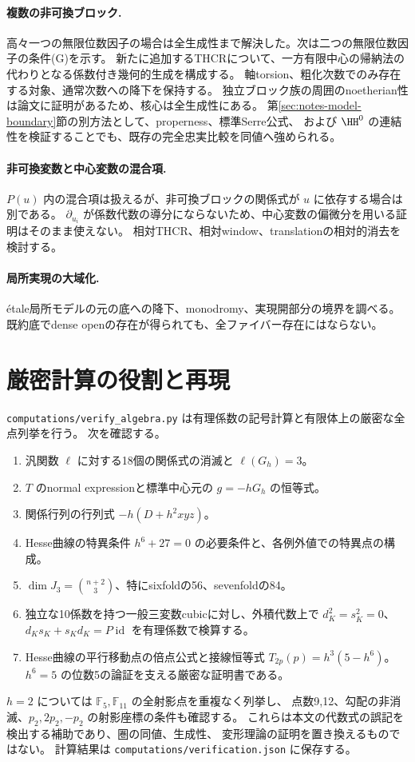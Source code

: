 \paragraph{複数の非可換ブロック.}
高々一つの無限位数因子の場合は全生成性まで解決した。次は二つの無限位数因子の条件(G)を示す。
新たに追加するTHCRについて、一方有限中心の帰納法の代わりとなる係数付き幾何的生成を構成する。
軸torsion、粗化次数でのみ存在する対象、通常次数への降下を保持する。
独立ブロック族の周囲のnoetherian性は論文に証明があるため、核心は全生成性にある。
第\ref{sec:notes-model-boundary}節の別方法として、properness、標準Serre公式、
および \(\HH^0\) の連結性を検証することでも、既存の完全忠実比較を同値へ強められる。

\paragraph{非可換変数と中心変数の混合項.}
\(P(u)\) 内の混合項は扱えるが、非可換ブロックの関係式が \(u\) に依存する場合は別である。
\(\partial_{u_i}\) が係数代数の導分にならないため、中心変数の偏微分を用いる証明はそのまま使えない。
相対THCR、相対window、translationの相対的消去を検討する。

\paragraph{局所実現の大域化.}
étale局所モデルの元の底への降下、monodromy、実現開部分の境界を調べる。
既約底でdense openの存在が得られても、全ファイバー存在にはならない。

\section{厳密計算の役割と再現}

\texttt{computations/verify\_algebra.py} は有理係数の記号計算と有限体上の厳密な全点列挙を行う。
次を確認する。
\begin{enumerate}
 \item 汎関数 \(\ell\) に対する18個の関係式の消滅と \(\ell(G_h)=3\)。
 \item \(T\) のnormal expressionと標準中心元の \(g=-hG_h\) の恒等式。
 \item 関係行列の行列式 \(-h(D+h^2xyz)\)。
 \item Hesse曲線の特異条件 \(h^6+27=0\) の必要条件と、各例外値での特異点の構成。
 \item \(\dim J_3=\binom{n+2}{3}\)、特にsixfoldの56、sevenfoldの84。
 \item 独立な10係数を持つ一般三変数cubicに対し、外積代数上で
 \(d_K^2=s_K^2=0\)、\(d_Ks_K+s_Kd_K=P\operatorname{id}\) を有理係数で検算する。
 \item Hesse曲線の平行移動点の倍点公式と接線恒等式
 \(T_{2p}(p)=h^3(5-h^6)\)。\(h^6=5\) の位数5の論証を支える厳密な証明書である。
\end{enumerate}
\(h=2\) については \(\mathbb F_5,\mathbb F_{11}\) の全射影点を重複なく列挙し、
点数9,12、勾配の非消滅、\(p_2,2p_2,-p_2\) の射影座標の条件も確認する。
これらは本文の代数式の誤記を検出する補助であり、圏の同値、生成性、
変形理論の証明を置き換えるものではない。
計算結果は \texttt{computations/verification.json} に保存する。

